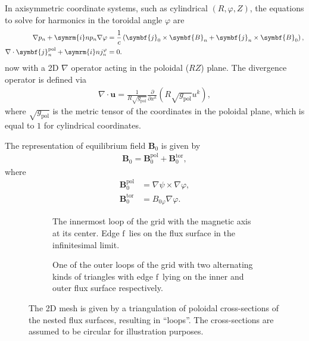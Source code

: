 \documentclass[a4paper, 10pt, english]{article}
\let\temp\vartheta
\let\vartheta\theta
\let\theta\temp
\let\temp\varphi
\let\varphi\phi
\let\phi\temp
\let\vec\symbf
\newcommand*\im{\ensuremath{\symrm{i}}}  %
\newcommand*\pd[2][]{\ensuremath{\frac{\partial #1}{\partial #2}}}  %
\newcommand*\pol{\ensuremath{\textrm{pol}}}  %
\newcommand*\tor{\ensuremath{\textrm{tor}}}  %
\newcommand*\fs{\ensuremath{\textrm{f}}}  %
\begin{document}
In axisymmetric coordinate systems, such as cylindrical $(R, \phi, Z)$, the equations to solve for harmonics in the toroidal angle $\phi$ are
\begin{align}
  \nabla p_{n} + \im n p_{n} \nabla \phi &= \frac{1}{c} \left( \vec{j}_{0} \times \vec{B}_{n} + \vec{j}_{n} \times \vec{B}_{0} \right), \label{eq:mhd-2} \\
  \nabla \cdot \vec{j}_{n}^{\pol}+ \im n j_{n}^{\phi} &= 0. \label{eq:divfree-2}
\end{align}
now with a 2D $\nabla$ operator acting in the poloidal ($RZ$) plane. The divergence operator is defined via
\begin{gather*}
  \nabla \cdot \vec{u} = \frac{1}{R \sqrt{g_{\pol}}} \pd{x^{k}} (R \sqrt{g_{\pol}} u^{k}),
\end{gather*}
where $\sqrt{g_{\pol}}$ is the metric tensor of the coordinates in the poloidal plane, which is equal to $1$ for cylindrical coordinates.

The representation of equilibrium field $\vec{B}_{0}$ is given by
\begin{gather}
  \vec{B}_{0} = \vec{B}_{0}^{\pol} + \vec{B}_{0}^{\tor},
\end{gather}
where 
\begin{align}
  \vec{B}_{0}^{\pol} &= \nabla \psi \times \nabla \phi, \\
  \vec{B}_{0}^{\tor} &= B_{0 \phi} \nabla \phi.
\end{align}

\begin{figure}
  \centering
  \begin{subfigure}[b]{0.33\textwidth}
    \centering
    
    \caption{The innermost loop of the grid with the magnetic axis at its center. Edge \fs\ lies on the flux surface in the infinitesimal limit.}
    \label{fig:grid0}
  \end{subfigure}
  \quad
  \begin{subfigure}[b]{0.5\textwidth}
    \centering
    
    \caption{One of the outer loops of the grid with two alternating kinds of triangles with edge \fs\ lying on the inner and outer flux surface respectively.}
    \label{fig:grid1}
  \end{subfigure}
  \caption{The 2D mesh is given by a triangulation of poloidal cross-sections of the nested flux surfaces, resulting in \enquote{loops}. The cross-sections are assumed to be circular for illustration purposes.}
  \label{fig:grid}
\end{figure}
\end{document}
